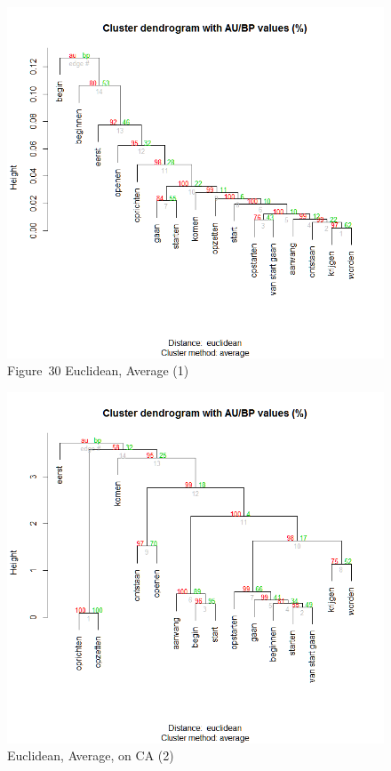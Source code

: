 \begin{figure}\includegraphics[height=.3\textheight]{figures/Vandevoorde2-img30.png}
 

\caption{
Figure~30  Euclidean, Average (1)}
\end{figure}

\begin{figure}
\includegraphics[height=.3\textheight]{figures/Vandevoorde2-img31.png}
\caption{\label{fig:key:31}  Euclidean, Average, on CA (2)}
\end{figure}

